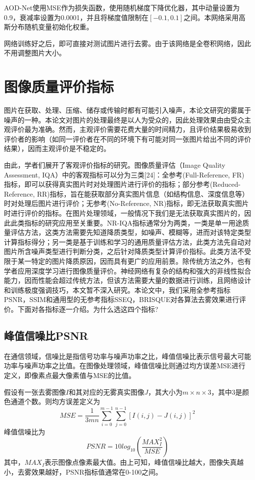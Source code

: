 \documentclass[a4paper, 12pt, oneside]{report}
\begin{document}
{AOD-Net使用MSE作为损失函数，使用随机梯度下降优化器，其中动量设置为0.9，衰减率设置为0.0001，并且将梯度值限制在$[-0.1, 0.1]$之间。本网络采用高斯分布随机变量初始化权重。
	
网络训练好之后，即可直接对测试图片进行去雾。由于该网络是全卷积网络，因此不用调整图片大小。

\section{图像质量评价指标\quad}
图片在获取、处理、压缩、储存或传输时都有可能引入噪声，本论文研究的雾属于噪声的一种。本论文对图片的处理最终是以人为受众的，因此处理效果由由受众主观评价最为准确。然而，主观评价需要花费大量的时间精力，且评价结果极易收到评价者的影响（如同一评价者在不同的环境下有可能对同一张图片给出不同的评价结果），因而主观评价是不稳定的。

由此，学者们展开了客观评价指标的研究。图像质量评估（Image Quality Assessment, IQA）中的客观指标可以分为三类[24]：全参考(Full-Reference, FR)指标，即可以获得真实图片时对处理图片进行评价的指标；部分参考(Reduced-Reference, RR)指标，旨在能获取部分真实图片信息（如结构信息、深度信息等）时对处理后图片进行评价；无参考(No-Reference, NR)指标，即无法获取真实图片时进行评价的指标。在图片处理领域，一般情况下我们是无法获取真实图片的，因此此类指标的研究应用至关重要。NR-IQA指标通常分为两类，一类是单一用途质量评估方法，这类方法需要先知道降质类型，如噪声、模糊等，进而对该特定类型计算指标得分；另一类是基于训练和学习的通用质量评估方法，此类方法先自动对图片所含噪声类型进行判断分类，之后针对降质类型计算评价指标。此类方法不受限于某一特定的图片降质原因，因而具有更广的应用前景。除传统方法之外，也有学者应用深度学习进行图像质量评价。神经网络有复杂的结构和强大的非线性拟合能力，因而性能会超过传统方法，但该方法需要大量的数据进行训练，且网络设计和训练极度强调技巧，本文暂不深入研究。本论文中，我们采用全参考指标PSNR，SSIM和通用型的无参考指标SSEQ，BRISQUE对各算法去雾效果进行评价。下面对各指标逐一介绍。{\Large 为什么选这四个指标?}



\subsection{峰值信噪比PSNR\quad}

在通信领域，信噪比是指信号功率与噪声功率之比，峰值信噪比表示信号最大可能功率与噪声功率之比值。在图像处理领域，峰值信噪比则通过均方误差MSE进行定义，即像素点最大像素值与MSE的比值。

假设有一张去雾图像$I$和其对应的无雾真实图像$J$，其大小为$m \times n \times 3$，其中3是颜色通道个数。则均方误差定义为
\begin{equation}
MSE = \frac{1}{3mn}\sum_{i = 0}^{m - 1}\sum_{j = 0}^{n - 1}{[I(i, j) - J(i, j)] }^2
\end{equation}
峰值信噪比为
\begin{equation}
PSNR = 10 log_{10}(\frac{MAX_I^2}{MSE})
\end{equation}
其中，$MAX_I$表示图像点像素最大值。由上可知，峰值信噪比越大，图像失真越小，去雾效果越好，PSNR指标值通常在0-100之间。
	
}
\end{document}
